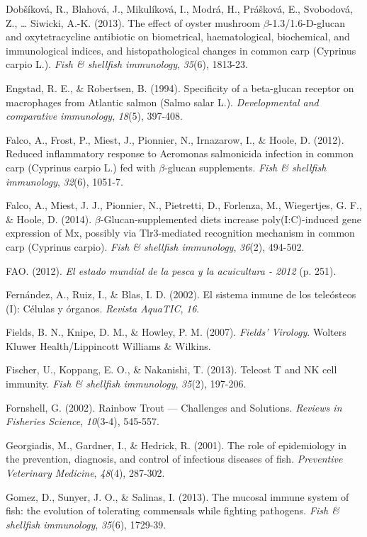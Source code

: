 \documentclass[12pt,letterpaper,oneside]{scrbook}
\begin{document}
Dobšíková, R., Blahová, J., Mikulíková, I., Modrá, H., Prášková, E.,
Svobodová, Z., \ldots{} Siwicki, A.-K. (2013). The effect of oyster
mushroom \(\beta\)-1.3/1.6-D-glucan and oxytetracycline antibiotic on
biometrical, haematological, biochemical, and immunological indices, and
histopathological changes in common carp (Cyprinus carpio L.).
\emph{Fish \& shellfish immunology}, \emph{35}(6), 1813-23.

Engstad, R. E., \& Robertsen, B. (1994). Specificity of a beta-glucan
receptor on macrophages from Atlantic salmon (Salmo salar L.).
\emph{Developmental and comparative immunology}, \emph{18}(5), 397-408.

Falco, A., Frost, P., Miest, J., Pionnier, N., Irnazarow, I., \& Hoole,
D. (2012). Reduced inflammatory response to Aeromonas salmonicida
infection in common carp (Cyprinus carpio L.) fed with \(\beta\)-glucan
supplements. \emph{Fish \& shellfish immunology}, \emph{32}(6), 1051-7.

Falco, A., Miest, J. J., Pionnier, N., Pietretti, D., Forlenza, M.,
Wiegertjes, G. F., \& Hoole, D. (2014). \(\beta\)-Glucan-supplemented
diets increase poly(I:C)-induced gene expression of Mx, possibly via
Tlr3-mediated recognition mechanism in common carp (Cyprinus carpio).
\emph{Fish \& shellfish immunology}, \emph{36}(2), 494-502.

FAO. (2012). \emph{El estado mundial de la pesca y la acuicultura -
2012} (p. 251).

Fernández, A., Ruiz, I., \& Blas, I. D. (2002). El sistema inmune de los
teleósteos (I): Células y órganos. \emph{Revista AquaTIC}, \emph{16}.

Fields, B. N., Knipe, D. M., \& Howley, P. M. (2007). \emph{Fields'
Virology}. Wolters Kluwer Health/Lippincott Williams \& Wilkins.

Fischer, U., Koppang, E. O., \& Nakanishi, T. (2013). Teleost T and NK
cell immunity. \emph{Fish \& shellfish immunology}, \emph{35}(2),
197-206.

Fornshell, G. (2002). Rainbow Trout --- Challenges and Solutions.
\emph{Reviews in Fisheries Science}, \emph{10}(3-4), 545-557.

Georgiadis, M., Gardner, I., \& Hedrick, R. (2001). The role of
epidemiology in the prevention, diagnosis, and control of infectious
diseases of fish. \emph{Preventive Veterinary Medicine}, \emph{48}(4),
287-302.

Gomez, D., Sunyer, J. O., \& Salinas, I. (2013). The mucosal immune
system of fish: the evolution of tolerating commensals while fighting
pathogens. \emph{Fish \& shellfish immunology}, \emph{35}(6), 1729-39.
\end{document}
